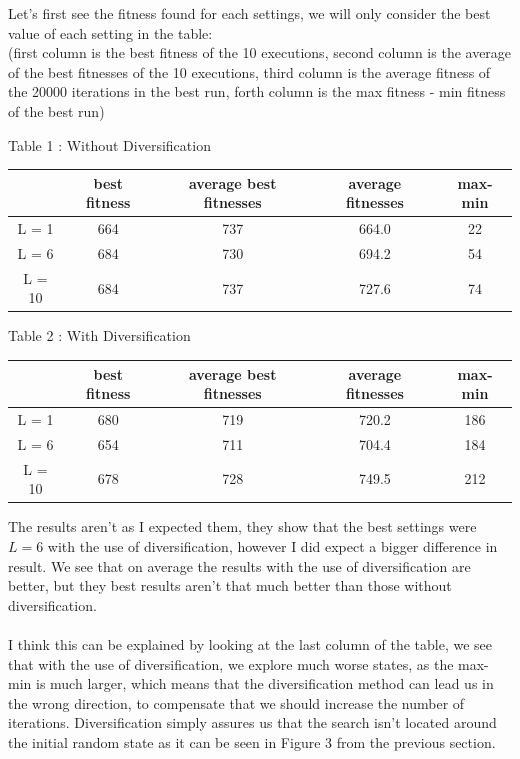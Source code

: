 \documentclass[a4paper]{article}
\begin{document}
Let's first see the fitness found for each settings, we will only consider the best value of each setting in the table: \\
(first column is the best fitness of the 10 executions, second column is the average of the best fitnesses of the 10 executions, third column is the average fitness of the 20000 iterations in the best run, forth column is the max fitness - min fitness of the best run)
\begin{center}
Table 1 : Without Diversification\\
\begin{tabular}{|c|c|c|c|c|}
\hline
&    best fitness   & average best fitnesses     &  average fitnesses   & max-min    \\ \hline
L = 1   & 664   & 737  & 664.0   & 22   \\ \hline
L = 6  & 684  & 730  & 694.2  & 54   \\ \hline
L = 10 & 684 & 737 & 727.6 & 74 \\ \hline
\end{tabular}
\end{center}
\begin{center}
Table 2 : With Diversification\\
\begin{tabular}{|c|c|c|c|c|}
\hline
&    best fitness   & average best fitnesses     &  average fitnesses   & max-min    \\ \hline
L = 1   & 680   & 719  & 720.2   & 186   \\ \hline
L = 6  & 654  & 711  & 704.4  & 184   \\ \hline
L = 10 & 678 & 728 & 749.5 & 212 \\ \hline
\end{tabular}
\end{center}

The results aren't as I expected them, they show that the best settings were $L=6$ with the use of diversification, however I did expect a bigger difference in result. We see that on average the results with the use of diversification are better, but they best results aren't that much better than those without diversification.\\\\
I think this can be explained by looking at the last column of the table, we see that with the use of diversification, we explore much worse states, as the max-min is much larger, which means that the diversification method can lead us in the wrong direction, to compensate that we should increase the number of iterations. Diversification simply assures us that the search isn't located around the initial random state as it can be seen in Figure 3 from the previous section.
\end{document}
